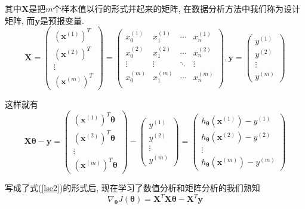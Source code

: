 \documentclass[a4paper,UTF8]{ctexart}
\theoremstyle{plain} \newtheorem{theorem}{定理}[section]
\theoremstyle{plain} \newtheorem{definition}{定义}[section]
\theoremstyle{plain} \newtheorem{lemma}{引理}[section]
\theoremstyle{plain} \newtheorem{proposition}{命题}[section]
\theoremstyle{plain} \newtheorem{example}{例}[section]
\theoremstyle{plain} \newtheorem{remark}{注}[section]
\theoremstyle{plain} \newtheorem{corollary}{推论}[section]
\begin{document}
其中$\bm{X}$是把$m$个样本值以行的形式并起来的矩阵, 在数据分析方法中我们称为设计矩阵, 而$\bm{y}$是预报变量.
$$
\bm{X} = 
\begin{pmatrix}
(\bm{x}^{(1)})^{T} \\
(\bm{x}^{(2)})^{T} \\
\vdots \\
(\bm{x}^{(m)})^{T} 
\end{pmatrix}
=
\begin{pmatrix}
x_{0}^{(1)}  &  x_{1}^{(1)}  &  \cdots  &  x_{n}^{(1)} \\
x_{0}^{(2)}  &  x_{1}^{(2)}  &  \cdots  &  x_{n}^{(2)} \\
\vdots       &  \vdots       &  \ddots  &  \vdots      \\
x_{0}^{(m)}  &  x_{1}^{(m)}  &  \cdots  &  x_{n}^{(m)} \\
\end{pmatrix}
,\bm{y}=
\begin{pmatrix}
y^{(1)} \\
y^{(2)} \\
\vdots  \\
y^{(m)}
\end{pmatrix}
$$

这样就有
$$
\bm{X} \bm{\theta} - \bm{y} = 
\begin{pmatrix}
(\bm{x}^{(1)})^{T} \bm{\theta} \\
(\bm{x}^{(2)})^{T} \bm{\theta} \\
\vdots \\
(\bm{x}^{(m)})^{T} \bm{\theta}
\end{pmatrix}
 - 
\begin{pmatrix}
y^{(1)} \\
y^{(2)} \\
\vdots  \\
y^{(m)}
\end{pmatrix}
 = 
\begin{pmatrix}
h_{\bm{\theta}}(\bm{x}^{(1)}) - y^{(1)} \\
h_{\bm{\theta}}(\bm{x}^{(2)}) - y^{(2)} \\
\vdots  \\
h_{\bm{\theta}}(\bm{x}^{(m)}) - y^{(m)}
\end{pmatrix}
$$


写成了式(\ref{lse2})的形式后, 现在学习了数值分析和矩阵分析的我们熟知
\begin{equation*}
\nabla_{\bm{\theta}} J(\bm{\theta}) = \bm{X}^{T} \bm{X} \bm{\theta} - \bm{X}^{T} \bm{y}
\end{equation*}
\end{document}
